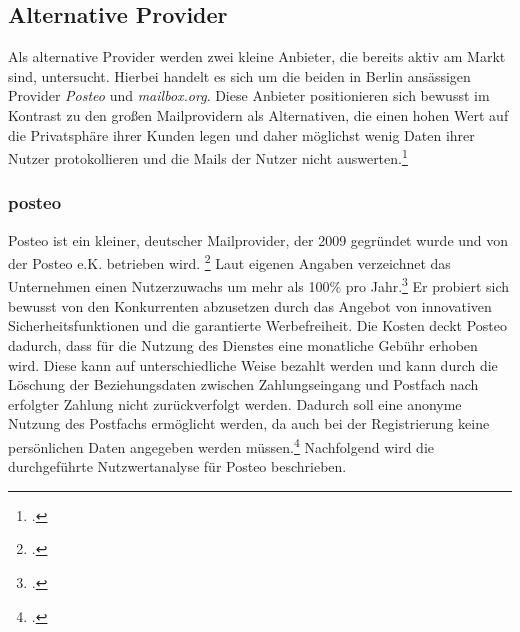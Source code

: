 \documentclass  [paper=a4,
				fontsize=12pt,
				listof=totoc,
				bibliography=totoc
				]{scrreprt}
\begin{document}
			\subsection{Alternative Provider}
			Als alternative Provider werden zwei kleine Anbieter, die bereits aktiv am Markt sind, untersucht.
			Hierbei handelt es sich um die beiden in Berlin ansässigen Provider \textit{Posteo} und \textit{mailbox.org}.
			Diese Anbieter positionieren sich bewusst im Kontrast zu den großen Mailprovidern als Alternativen, die einen hohen Wert auf die Privatsphäre ihrer Kunden legen und daher möglichst wenig Daten ihrer Nutzer protokollieren und die Mails der Nutzer nicht auswerten.\footcite[Vgl.][]{Posteo2013a, Mailbox2014}
			\newpage
				\subsubsection{posteo}
				\label{subsubsec:posteo}
					Posteo ist ein kleiner, deutscher Mailprovider, der 2009 gegründet wurde und von der Posteo e.K. betrieben wird. \footcite[Vgl.][]{Posteo2013b}
					Laut eigenen Angaben verzeichnet das Unternehmen einen Nutzerzuwachs um mehr als 100\% pro Jahr.\footcite[Vgl.][]{Posteo2013b}
					Er probiert sich bewusst von den Konkurrenten abzusetzen durch das Angebot von innovativen Sicherheitsfunktionen und die garantierte Werbefreiheit.
					Die Kosten deckt Posteo dadurch, dass für die Nutzung des Dienstes eine monatliche Gebühr erhoben wird.
					Diese kann auf unterschiedliche Weise bezahlt werden und kann durch die Löschung der Beziehungsdaten zwischen Zahlungseingang und Postfach nach erfolgter Zahlung nicht zurückverfolgt werden.
					Dadurch soll eine anonyme Nutzung des Postfachs ermöglicht werden, da auch bei der Registrierung keine persönlichen Daten angegeben werden müssen.\footcite[Vgl.][]{Posteo2013a}
					Nachfolgend wird die durchgeführte Nutzwertanalyse für Posteo beschrieben.
					\vspace{-6pt}					
\end{document}
